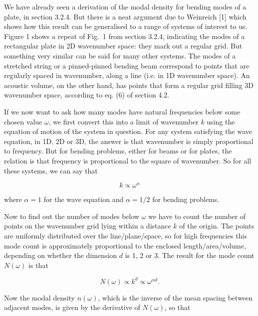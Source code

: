   We have already seen a derivation of the modal density for bending modes of a 
  plate, in section 3.2.4. But there is a neat argument due to Weinreich [1] 
  which shows how this result can be generalised to a range of systems of 
  interest to us. Figure 1 shows a repeat of Fig.\ 1 from section 3.2.4, 
  indicating the modes of a rectangular plate in 2D wavenumber space: they mark 
  out a regular grid. But something very similar can be said for many other 
  systems. The modes of a stretched string or a pinned-pinned bending beam 
  correspond to points that are regularly spaced in wavenumber, along a line 
  (i.e. in 1D wavenumber space). An acoustic volume, on the other hand, has 
  points that form a regular grid filling 3D wavenumber space, according to eq. 
  (6) of section 4.2. 


  If we now want to ask how many modes have natural frequencies below some 
  chosen value $\omega$, we first convert this into a limit of wavenumber $k$ 
  using the equation of motion of the system in question. For any system 
  satisfying the wave equation, in 1D, 2D or 3D, the answer is that wavenumber 
  is simply proportional to frequency. But for bending problems, either for 
  beams or for plates, the relation is that frequency is proportional to the 
  square of wavenumber. So for all these systems, we can say that 

  $$k \propto \omega^\alpha \tag{1}$$ 

  where $\alpha=1$ for the wave equation and $\alpha = 1/2$ for bending 
  problems. 

  Now to find out the number of modes below $\omega$ we have to count the 
  number of points on the wavenumber grid lying within a distance $k$ of the 
  origin. The points are uniformly distributed over the line/plane/space, so 
  for high frequencies this mode count is approximately proportional to the 
  enclosed length/area/volume, depending on whether the dimension $d$ is 1, 2 
  or 3. The result for the mode count $N(\omega)$ is that 

  $$N(\omega) \propto k^d \propto \omega^{\alpha d} . \tag{2}$$ 

  Now the modal density $n(\omega)$, which is the inverse of the mean spacing 
  between adjacent modes, is given by the derivative of $N(\omega)$, so that 

